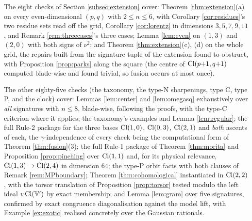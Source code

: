 The eight checks of Section \ref{subsec:extension} cover: Theorem \ref{thm:extension}(a) on every even-dimensional $(p,q)$ with $2 \leq n \leq 6$, with Corollary \ref{cor:residues}'s two residue sets read off the grid, Corollary \ref{cor:lorentz} in dimensions $3, 5, 7, 9, 11$, and Remark \ref{rem:threecases}'s three cases; Lemma \ref{lem:even} on $(1,3)$ and $(2,0)$ with both signs of $\nu^2$; and Theorem \ref{thm:extension}(c), (d) on the whole grid, the repairs built from the signature tuple of the extension found to obstruct, with Proposition \ref{prop:parks} along the square (the centre of $\mathrm{Cl}(p{+}1,q{+}1)$ computed blade-wise and found trivial, so fusion occurs at most once).

The other eighty-five checks (the taxonomy, the type-N sharpenings, type C, type P, and the clock) cover: Lemmas \ref{lem:center} and \ref{lem:omegasq} exhaustively over \emph{all} signatures with $n \leq 8$, blade-wise, following the proofs, with the type-C criterion where it applies; the taxonomy's examples and Lemma \ref{lem:regular}; the full Rule-2 package for the three bases $\mathrm{Cl}(1,0)$, $\mathrm{Cl}(0,3)$, $\mathrm{Cl}(2,1)$ and \emph{both} ascents of each, the $\gamma$-independence of every check being the computational form of Theorem \ref{thm:fusion}(3); the full Rule-1 package of Theorem \ref{thm:morita} and Proposition \ref{prop:pinching} over $\mathrm{Cl}(1,1)$ and, for its physical relevance, $\mathrm{Cl}(1,3) \to \mathrm{Cl}(2,4)$ in dimension $64$; the type-P orbit facts with both clauses of Remark \ref{rem:MPboundary}; Theorem \ref{thm:cohomological} instantiated in $\mathrm{Cl}(2,2)$, with the torsor translation of Proposition \ref{prop:torsor} tested modulo the left ideal $v\,\mathrm{Cl}(\mathbb{V}')$ by exact membership; and Lemma \ref{lem:gram} over five signatures, confirmed by exact congruence diagonalisation against the model lift, with Example \ref{ex:exotic} realised concretely over the Gaussian rationals.

